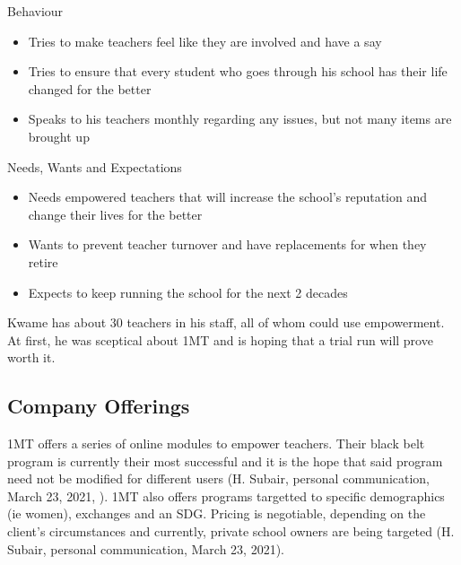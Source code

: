 \documentclass[letterpaper]{article}
\begin{document}
            \begin{multicols}{2}
                \begin{large}
                    Behaviour
                \end{large}
                \begin{itemize}
                    \item Tries to make teachers feel like they are involved and have a say
                    \item Tries to ensure that every student who goes through his school has their life changed for the better
                    \item Speaks to his teachers monthly regarding any issues, but not many items are brought up
                \end{itemize}
                \begin{large}
                    Needs, Wants and Expectations
                \end{large}
                \begin{itemize}
                    \item Needs empowered teachers that will increase the school's reputation and change their lives for the better
                    \item Wants to prevent teacher turnover and have replacements for when they retire
                    \item Expects to keep running the school for the next 2 decades
                \end{itemize}
            \end{multicols}
            Kwame has about 30 teachers in his staff, all of whom could use empowerment. At first, he was sceptical about 1MT and is hoping that a trial run will prove worth it.
    
    \subsection{Company Offerings}
        
        1MT offers a series of online modules to empower teachers. Their black belt program is currently their most successful and it is the hope that said program need not be modified for different users (H. Subair, personal communication, March 23, 2021, \cite{companysite-programs}). 1MT also offers programs targetted to specific demographics (ie women), exchanges and an SDG. Pricing is negotiable, depending on the client's circumstances and currently, private school owners are being targeted (H. Subair, personal communication, March 23, 2021).
\end{document}
